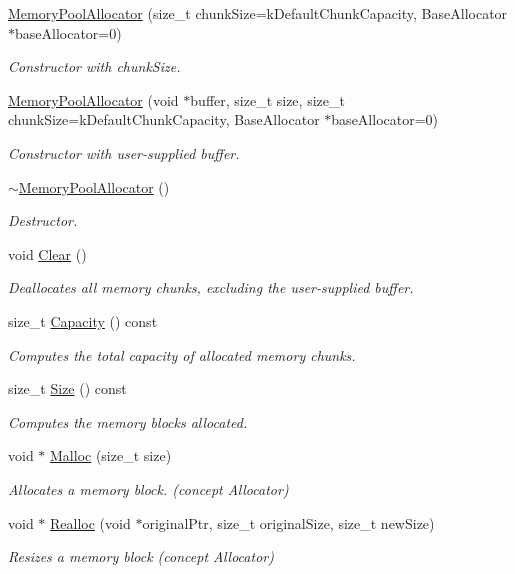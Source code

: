 \begin{DoxyCompactItemize}
\item 
\hyperlink{classMemoryPoolAllocator_aeec85ac657f242ac5620115141be5209}{Memory\+Pool\+Allocator} (size\+\_\+t chunk\+Size=k\+Default\+Chunk\+Capacity, Base\+Allocator $\ast$base\+Allocator=0)
\begin{DoxyCompactList}\small\item\em Constructor with chunk\+Size. \end{DoxyCompactList}\item 
\hyperlink{classMemoryPoolAllocator_a1f0d865093fdb955d956b7a445a8ddbf}{Memory\+Pool\+Allocator} (void $\ast$buffer, size\+\_\+t size, size\+\_\+t chunk\+Size=k\+Default\+Chunk\+Capacity, Base\+Allocator $\ast$base\+Allocator=0)
\begin{DoxyCompactList}\small\item\em Constructor with user-\/supplied buffer. \end{DoxyCompactList}\item 
\hyperlink{classMemoryPoolAllocator_ad4eee0ef3cfe8cda31034fbce98b7a9b}{$\sim$\+Memory\+Pool\+Allocator} ()
\begin{DoxyCompactList}\small\item\em Destructor. \end{DoxyCompactList}\item 
void \hyperlink{classMemoryPoolAllocator_a57bbc80e570db6110901b9a7e36dbda0}{Clear} ()
\begin{DoxyCompactList}\small\item\em Deallocates all memory chunks, excluding the user-\/supplied buffer. \end{DoxyCompactList}\item 
size\+\_\+t \hyperlink{classMemoryPoolAllocator_ac4738338f038d040641f23aa7955e2d3}{Capacity} () const 
\begin{DoxyCompactList}\small\item\em Computes the total capacity of allocated memory chunks. \end{DoxyCompactList}\item 
size\+\_\+t \hyperlink{classMemoryPoolAllocator_a2ccb6c068b8b35dbc3680dc5563af2f4}{Size} () const 
\begin{DoxyCompactList}\small\item\em Computes the memory blocks allocated. \end{DoxyCompactList}\item 
void $\ast$ \hyperlink{classMemoryPoolAllocator_a02f6832910453446cb77bf919ba49e99}{Malloc} (size\+\_\+t size)
\begin{DoxyCompactList}\small\item\em Allocates a memory block. (concept Allocator) \end{DoxyCompactList}\item 
void $\ast$ \hyperlink{classMemoryPoolAllocator_aba75280d42184b0ad414243f7f5ac6c7}{Realloc} (void $\ast$original\+Ptr, size\+\_\+t original\+Size, size\+\_\+t new\+Size)
\begin{DoxyCompactList}\small\item\em Resizes a memory block (concept Allocator) \end{DoxyCompactList}\end{DoxyCompactItemize}

